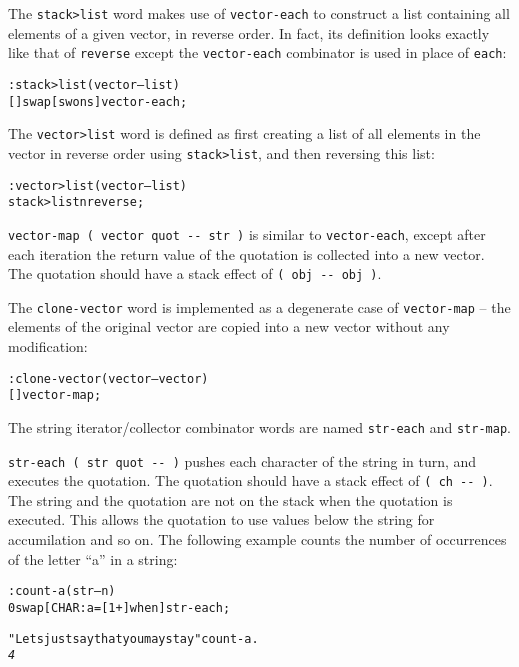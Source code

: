 \documentclass[english]{article}
\begin{document}
{The \texttt{stack>list} word makes use of \texttt{vector-each} to construct a list containing all elements of a given vector, in reverse order. In fact, its definition looks exactly like that of \texttt{reverse} except the \texttt{vector-each} combinator is used in place of \texttt{each}:

\begin{alltt}
: stack>list ( vector -- list )
    {[} {]} swap {[} swons {]} vector-each ;
\end{alltt}

The \texttt{vector>list} word is defined as first creating a list of all elements in the vector in reverse order using \texttt{stack>list}, and then reversing this list:

\begin{alltt}
: vector>list ( vector -- list )
    stack>list nreverse ;
\end{alltt}

\texttt{vector-map ( vector quot -{}- str )} is similar to \texttt{vector-each}, except after each iteration the return value of the quotation is collected into a new vector. The quotation should have a stack effect of \texttt{( obj -{}- obj )}.

The \texttt{clone-vector} word is implemented as a degenerate case of \texttt{vector-map} -- the elements of the original vector are copied into a new vector without any modification:

\begin{alltt}
: clone-vector ( vector -- vector )
    {[} {]} vector-map ;
\end{alltt}

The string iterator/collector combinator words are named \texttt{str-each} and \texttt{str-map}.

\texttt{str-each ( str quot -{}- )} pushes each character of the string in turn, and executes the quotation. The quotation should have a stack effect of \texttt{( ch -{}- )}. The string and the quotation are not on the stack when the quotation is executed. This allows the quotation to use values below the string for accumilation and so on. The following example counts the number of occurrences of the letter ``a'' in a string:

\begin{alltt}
: count-a ( str -- n )
    0 swap {[} CHAR: a = {[} 1 + {]} when {]} str-each ;

"Lets just say that you may stay" count-a .
\emph{4}
\end{alltt}

}
\end{document}

